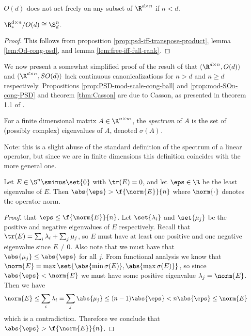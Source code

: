 \begin{corollary}
    $O(d)$ does not act freely on any subset of $\R^{d \times n}$ if $n < d$.
\end{corollary}

\begin{corollary}
    $\R^{d \times n}_* / O(d) \cong \S^n_d$.
    \begin{proof}
        This follows from proposition \ref{prop:psd-iff-transpose-product}, lemma \ref{lem:Od-cong-psd}, and lemma \ref{lem:free-iff-full-rank}.
    \end{proof}
\end{corollary}

We now present a somewhat simplified proof of the result of \cite{colman2013equivariant}  that $(\R^{d \times n}, O(d))$ and $(\R^{d \times n}, SO(d))$ lack continuous canonicalizations for $n > d$ and $n \geq d$ respectively.
Propositions \ref{prop:PSD-mod-scale-cong-ball} and \ref{prop:mod-SOn-cong-PSD} and theorem \ref{thm:Casson} are due to Casson, as presented in theorem 1.1 of \cite{kendall1999shape}.

\begin{definition}
    For a finite dimensional matrix $A \in \R^{n \times m}$, the \emph{spectrum} of $A$ is the set of (possibly complex) eigenvalues of $A$, denoted $\sigma(A)$.

    Note: this is a slight abuse of the standard definition of the spectrum of a linear operator, but since we are in finite dimensions this definition coincides with the more general one.
\end{definition}

\begin{lemma}\label{lem:sym-tr0-eigenbound}
    Let $E \in \S^n \sminus \set{0}$ with $\tr(E) = 0$, and let $\eps \in \R$ be the least eigenvalue of $E$.
    Then $\abs{\eps} > \f{\norm{E}}{n}$ where $\norm{\cdot}$ denotes the operator norm.
    \begin{proof}
        \Afsoc that $\eps \leq \f{\norm{E}}{n}$.
        Let $\set{\lambda_i}$ and $\set{\mu_j}$ be the positive and negative eigenvalues of $E$ respectively.
        Recall that $\tr(E) = \sum_i \lambda_i + \sum_j \mu_j$, so $E$ must have at least one positive and one negative eigenvalue since $E \neq 0$.
        Also note that we must have that $\abs{\mu_j} \leq \abs{\eps}$ for all $j$.
        From functional analysis we know that $\norm{E} = \max\set{\abs{\min \sigma(E)}, \abs{\max \sigma(E)}}$, so since $\abs{\eps} < \norm{E}$ we must have some positive eigenvalue $\lambda_j = \norm{E}$.
        Then we have
        \[
            \norm{E}
            \leq \sum_i \lambda_i
            = \sum_j \abs{\mu_j}
            \leq (n-1) \abs{\eps}
            < n \abs{\eps}
            \leq \norm{E}
        \]
        which is a contradiction.
        Therefore we conclude that $\abs{\eps} > \f{\norm{E}}{n}$.
    \end{proof}
\end{lemma}

